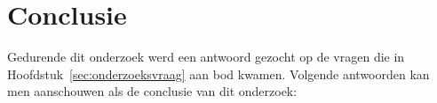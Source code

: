 
\chapter{Conclusie}
\label{ch:conclusie}

Gedurende dit onderzoek werd een antwoord gezocht op de vragen die in Hoofdstuk~\ref{sec:onderzoeksvraag} aan bod kwamen. Volgende antwoorden kan men aanschouwen als de conclusie van dit onderzoek:  

